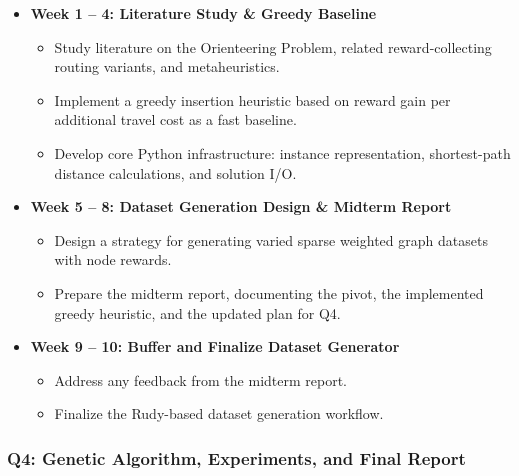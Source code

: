 \documentclass[report,english,cleveref,autoref,a4paper]{lipics-v2021}
\begin{document}
\begin{itemize}
  \item \textbf{Week 1 -- 4: Literature Study \& Greedy Baseline}
  \begin{itemize}
    \item Study literature on the Orienteering Problem, related reward-collecting routing variants, and metaheuristics.
    \item Implement a greedy insertion heuristic based on reward gain per additional travel cost as a fast baseline.
    \item Develop core Python infrastructure: instance representation, shortest-path distance calculations, and solution I/O.
  \end{itemize}

  \item \textbf{Week 5 -- 8: Dataset Generation Design \& Midterm Report}
  \begin{itemize}
    \item Design a strategy for generating varied sparse weighted graph datasets with node rewards.
    \item Prepare the midterm report, documenting the pivot, the implemented greedy heuristic, and the updated plan for Q4.
  \end{itemize}
  
  \item \textbf{Week 9 -- 10: Buffer and Finalize Dataset Generator}
  \begin{itemize}
    \item Address any feedback from the midterm report.
    \item Finalize the Rudy-based dataset generation workflow.
  \end{itemize}
\end{itemize}

\subsubsection{Q4: Genetic Algorithm, Experiments, and Final Report}
\end{document}
